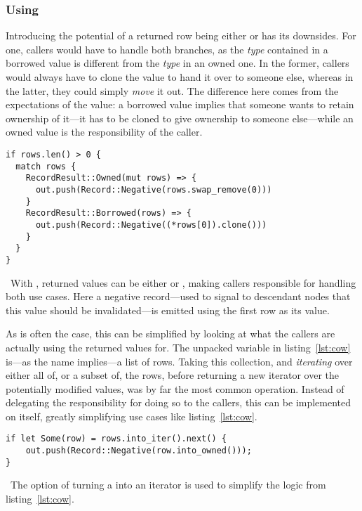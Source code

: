 \subsubsection{Using }
Introducing the potential of a returned row being either  or
 has its downsides. For one, callers would have to handle both
branches, as the \textit{type} contained in a borrowed value is different from
the \textit{type} in an owned one. In the former, callers would always have to
clone the value to hand it over to someone else, whereas in the latter, they
could simply \textit{move} it out. The difference here comes from the
expectations of the value: a borrowed value implies that someone wants to retain
ownership of it---\eg it has to be cloned to give ownership to someone
else---while an owned value is the responsibility of the caller.

\begin{listing}[H]
  \begin{verbatim}
if rows.len() > 0 {
  match rows {
    RecordResult::Owned(mut rows) => {
      out.push(Record::Negative(rows.swap_remove(0)))
    }
    RecordResult::Borrowed(rows) => {
      out.push(Record::Negative((*rows[0]).clone()))
    }
  }
}
  \end{verbatim}
  \caption{\
    With , returned values can be either  or
    \code{Owned}, making callers responsible for handling both use cases. Here
    a negative record---used to signal to descendant nodes that this value
    should be invalidated---is emitted using the first row as its value.
  }\label{lst:cow}
\end{listing}

As is often the case, this can be simplified by looking at what the callers are
actually using the returned values for. The unpacked \code{rows} variable in
listing~\ref{lst:cow} is---as the name implies---a list of rows. Taking this
collection, and \textit{iterating} over either all of, or a subset of, the rows,
before returning a new iterator over the potentially modified values, was by far
the most common operation. Instead of delegating the responsibility for doing so
to the callers, this can be implemented on \code{RecordResult} itself, greatly
simplifying use cases like listing~\ref{lst:cow}.

\begin{listing}[H]
  \begin{verbatim}
if let Some(row) = rows.into_iter().next() {
    out.push(Record::Negative(row.into_owned()));
}
  \end{verbatim}
  \caption{\
    The option of turning a  into an iterator is used to
    simplify the logic from listing~\ref{lst:cow}.
  }\label{lst:cow-better}
\end{listing}

